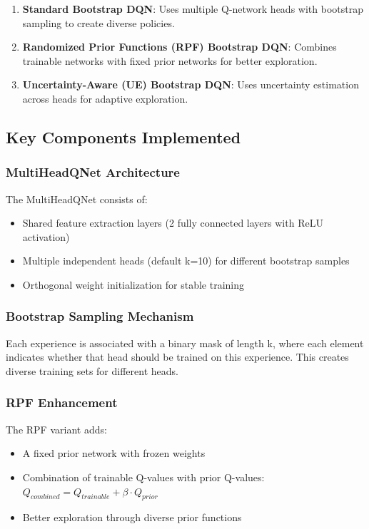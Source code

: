 \documentclass[12pt]{article}
\begin{document}
{{{\begin{enumerate}
    \item \textbf{Standard Bootstrap DQN}: Uses multiple Q-network heads with bootstrap sampling to create diverse policies.
    \item \textbf{Randomized Prior Functions (RPF) Bootstrap DQN}: Combines trainable networks with fixed prior networks for better exploration.
    \item \textbf{Uncertainty-Aware (UE) Bootstrap DQN}: Uses uncertainty estimation across heads for adaptive exploration.
\end{enumerate}

\subsection{Key Components Implemented}

\subsubsection{MultiHeadQNet Architecture}
The MultiHeadQNet consists of:
\begin{itemize}
    \item Shared feature extraction layers (2 fully connected layers with ReLU activation)
    \item Multiple independent heads (default k=10) for different bootstrap samples
    \item Orthogonal weight initialization for stable training
\end{itemize}

\subsubsection{Bootstrap Sampling Mechanism}
Each experience is associated with a binary mask of length k, where each element indicates whether that head should be trained on this experience. This creates diverse training sets for different heads.

\subsubsection{RPF Enhancement}
The RPF variant adds:
\begin{itemize}
    \item A fixed prior network with frozen weights
    \item Combination of trainable Q-values with prior Q-values: $Q_{combined} = Q_{trainable} + \beta \cdot Q_{prior}$
    \item Better exploration through diverse prior functions
\end{itemize}

}}}
\end{document}
